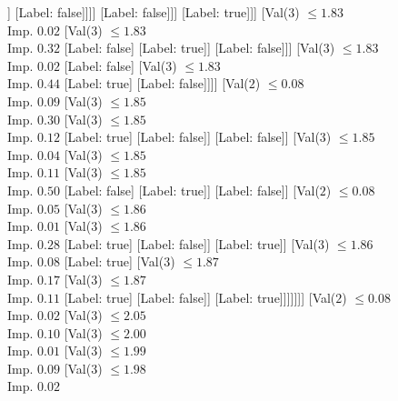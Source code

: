 \documentclass[margin=10pt]{standalone}
\begin{document}
\begin{forest}
																	[Val($3$) $ \leq 1.82$ \\ Imp. $0.50$
																		[Label: false]
																		[Label: true]]
																	[Label: false]]]]
														[Label: false]]]
												[Label: true]]]
										[Val($3$) $ \leq 1.83$ \\ Imp. $0.02$
											[Val($3$) $ \leq 1.83$ \\ Imp. $0.32$
												[Label: false]
												[Label: true]]
											[Label: false]]]
									[Val($3$) $ \leq 1.83$ \\ Imp. $0.02$
										[Label: false]
										[Val($3$) $ \leq 1.83$ \\ Imp. $0.44$
											[Label: true]
											[Label: false]]]]
								[Val($2$) $ \leq 0.08$ \\ Imp. $0.09$
									[Val($3$) $ \leq 1.85$ \\ Imp. $0.30$
										[Val($3$) $ \leq 1.85$ \\ Imp. $0.12$
											[Label: true]
											[Label: false]]
										[Label: false]]
									[Val($3$) $ \leq 1.85$ \\ Imp. $0.04$
										[Val($3$) $ \leq 1.85$ \\ Imp. $0.11$
											[Val($3$) $ \leq 1.85$ \\ Imp. $0.50$
												[Label: false]
												[Label: true]]
											[Label: false]]
										[Val($2$) $ \leq 0.08$ \\ Imp. $0.05$
											[Val($3$) $ \leq 1.86$ \\ Imp. $0.01$
												[Val($3$) $ \leq 1.86$ \\ Imp. $0.28$
													[Label: true]
													[Label: false]]
												[Label: true]]
											[Val($3$) $ \leq 1.86$ \\ Imp. $0.08$
												[Label: true]
												[Val($3$) $ \leq 1.87$ \\ Imp. $0.17$
													[Val($3$) $ \leq 1.87$ \\ Imp. $0.11$
														[Label: true]
														[Label: false]]
													[Label: true]]]]]]]
							[Val($2$) $ \leq 0.08$ \\ Imp. $0.02$
								[Val($3$) $ \leq 2.05$ \\ Imp. $0.10$
									[Val($3$) $ \leq 2.00$ \\ Imp. $0.01$
										[Val($3$) $ \leq 1.99$ \\ Imp. $0.09$
											[Val($3$) $ \leq 1.98$ \\ Imp. $0.02$

\end{forest}
\end{document}
